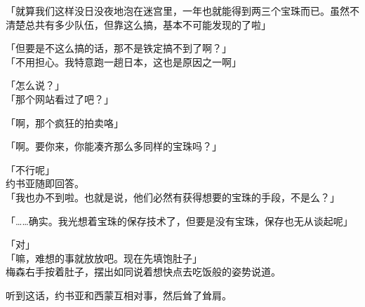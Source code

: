 「就算我们这样没日没夜地泡在迷宫里，一年也就能得到两三个宝珠而已。虽然不清楚总共有多少队伍，但靠这么搞，基本不可能发现的了啦」

「但要是不这么搞的话，那不是铁定搞不到了啊？」\\

「不用担心。我特意跑一趟日本，这也是原因之一啊」

「怎么说？」\\

「那个网站看过了吧？」

「啊，那个疯狂的拍卖咯」

「啊。要你来，你能凑齐那么多同样的宝珠吗？」

「不行呢」\\

约书亚随即回答。\\

「我也办不到啦。也就是说，他们必然有获得想要的宝珠的手段，不是么？」

「……确实。我光想着宝珠的保存技术了，但要是没有宝珠，保存也无从谈起呢」

「对」\\

「嘛，难想的事就放放吧。现在先填饱肚子」\\

梅森右手按着肚子，摆出如同说着想快点去吃饭般的姿势说道。

听到这话，约书亚和西蒙互相对事，然后耸了耸肩。\\

